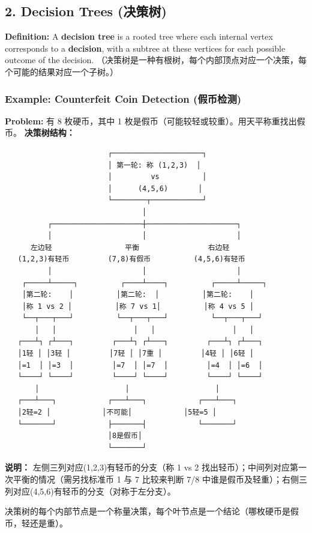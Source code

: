 \documentclass[10pt,a4paper,openany]{ctexbook}
\theoremstyle{definition}
\theoremstyle{remark}
\renewenvironment{quote}
  {\list{}{\leftmargin=1em\rightmargin=0pt\topsep=0.5pt\partopsep=0pt}\item[]}
  {\endlist}
\begin{document}
\subsection{2. Decision Trees (决策树)}

\textbf{Definition:} A \textbf{decision tree} is a rooted tree where each internal vertex corresponds to a \textbf{decision}, with a subtree at these vertices for each possible outcome of the decision.
（决策树是一种有根树，每个内部顶点对应一个决策，每个可能的结果对应一个子树。）
\subsubsection{Example: Counterfeit Coin Detection (假币检测)}

\textbf{Problem:} 有 8 枚硬币，其中 1 枚是假币（可能较轻或较重）。用天平称重找出假币。
\textbf{决策树结构：}
{\footnotesize\begin{verbatim}
                        ┌─────────────────────┐
                        │ 第一轮: 称 (1,2,3)  │
                        │         vs          │
                        │      (4,5,6)       │
                        └────────┬────────────┘
                                │
          ┌─────────────────────┼─────────────────────┐
          │                     │                     │
      左边轻                 平衡                右边轻
   (1,2,3)有轻币         (7,8)有假币          (4,5,6)有轻币
          │                     │                     │
    ┌─────┴─────┐          ┌────┴────┐          ┌─────┴─────┐
    │第二轮:    │          │第二轮:  │          │第二轮:    │
    │称 1 vs 2 │          │称 7 vs 1│          │称 4 vs 5 │
    └──┬───┬───┘          └──┬───┬───┘          └──┬───┬───┘
       │   │                  │   │                  │   │
   ┌───┴┐ ┌┴───┐         ┌───┴┐ ┌┴───┐         ┌───┴┐ ┌┴───┐
   │1轻 │ │3轻 │         │7轻 │ │7重 │         │4轻 │ │6轻 │
   │=1  │ │=3  │         │=7  │ │=7  │         │=4  │ │=6  │
   └────┘ └────┘         └────┘ └────┘         └────┘ └────┘
       │                    │                    │
   ┌───┴───┐            ┌───┴───┐            ┌───┴───┐
   │2轻=2 │            │不可能│            │5轻=5 │
   └───────┘            ├───────┤            └───────┘
                        │8是假币│
                        └───────┘
\end{verbatim}}

\textbf{说明：} 左侧三列对应(1,2,3)有轻币的分支（称 1 vs 2 找出轻币）；中间列对应第一次平衡的情况（需另找标准币 1 与 7 比较来判断 7/8 中谁是假币及轻重）；右侧三列对应(4,5,6)有轻币的分支（对称于左分支）。
\begin{quote}
决策树的每个内部节点是一个称量决策，每个叶节点是一个结论（哪枚硬币是假币，轻还是重）。

\end{quote}
\vspace{-2pt}
\end{document}
